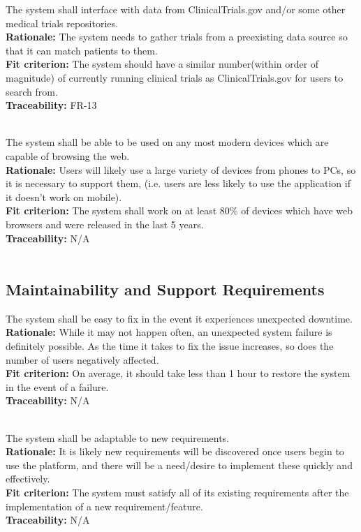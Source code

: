 \documentclass[12pt, titlepage]{article}
\newcounter{NFR_Counter}
\newcounter{FR_Counter}
\begin{document}
The system shall interface with data from ClinicalTrials.gov and/or some other medical trials repositories.\\
\textbf{Rationale:}
The system needs to gather trials from a preexisting data source so that it can match patients to them.\\
\textbf{Fit criterion:}
The system should have a similar number(within order of magnitude) of currently running clinical trials as ClinicalTrials.gov for users to search from.\\
\textbf{Traceability:}
FR-13 \\~\\
\addtocounter{NFR_Counter}{1}

The system shall be able to be used on any most modern devices which are capable of browsing the web.\\
\textbf{Rationale:}
Users will likely use a large variety of devices from phones to PCs, so it is necessary to support them, (i.e. users are less likely to use the application if it doesn't work on mobile).\\
\textbf{Fit criterion:}
The system shall work on at least 80\% of devices which have web browsers and were released in the last 5 years.\\
\textbf{Traceability:}
N/A \\~\\
\addtocounter{NFR_Counter}{1}

\subsection{Maintainability and Support Requirements}


The system shall be easy to fix in the event it experiences unexpected downtime.\\
\textbf{Rationale:}
While it may not happen often, an unexpected system failure is definitely possible. As the time it takes 
to fix the issue increases, so does the number of users negatively affected.\\
\textbf{Fit criterion:}
On average, it should take less than 1 hour to restore the system in the event of a failure.\\
\textbf{Traceability:}
N/A \\~\\
\addtocounter{NFR_Counter}{1}


The system shall be adaptable to new requirements.\\
\textbf{Rationale:}
It is likely new requirements will be discovered once users begin to use the platform, and there will be a need/desire to 
implement these quickly and effectively.\\
\textbf{Fit criterion:}
The system must satisfy all of its existing requirements after the implementation of a new requirement/feature.\\
\textbf{Traceability:}
N/A
\addtocounter{NFR_Counter}{1}
\end{document}
